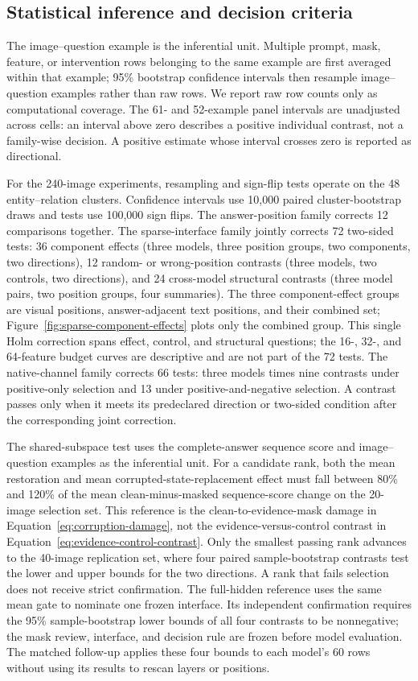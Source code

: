 \subsection{Statistical inference and decision criteria}

The image--question example is the inferential unit. Multiple prompt, mask, feature, or intervention rows belonging to the same example are first averaged within that example; 95\% bootstrap confidence intervals then resample image--question examples rather than raw rows. We report raw row counts only as computational coverage. The 61- and 52-example panel intervals are unadjusted across cells: an interval above zero describes a positive individual contrast, not a family-wise decision. A positive estimate whose interval crosses zero is reported as directional.

For the 240-image experiments, resampling and sign-flip tests operate on the 48 entity--relation clusters. Confidence intervals use 10,000 paired cluster-bootstrap draws and tests use 100,000 sign flips. The answer-position family corrects 12 comparisons together. The sparse-interface family jointly corrects 72 two-sided tests: 36 component effects (three models, three position groups, two components, two directions), 12 random- or wrong-position contrasts (three models, two controls, two directions), and 24 cross-model structural contrasts (three model pairs, two position groups, four summaries). The three component-effect groups are visual positions, answer-adjacent text positions, and their combined set; Figure~\ref{fig:sparse-component-effects} plots only the combined group. This single Holm correction spans effect, control, and structural questions; the 16-, 32-, and 64-feature budget curves are descriptive and are not part of the 72 tests. The native-channel family corrects 66 tests: three models times nine contrasts under positive-only selection and 13 under positive-and-negative selection. A contrast passes only when it meets its predeclared direction or two-sided condition after the corresponding joint correction.

The shared-subspace test uses the complete-answer sequence score and image--question examples as the inferential unit. For a candidate rank, both the mean restoration and mean corrupted-state-replacement effect must fall between 80\% and 120\% of the mean clean-minus-masked sequence-score change on the 20-image selection set. This reference is the clean-to-evidence-mask damage in Equation~\ref{eq:corruption-damage}, not the evidence-versus-control contrast in Equation~\ref{eq:evidence-control-contrast}. Only the smallest passing rank advances to the 40-image replication set, where four paired sample-bootstrap contrasts test the lower and upper bounds for the two directions. A rank that fails selection does not receive strict confirmation. The full-hidden reference uses the same mean gate to nominate one frozen interface. Its independent confirmation requires the 95\% sample-bootstrap lower bounds of all four contrasts to be nonnegative; the mask review, interface, and decision rule are frozen before model evaluation. The matched follow-up applies these four bounds to each model's 60 rows without using its results to rescan layers or positions.

